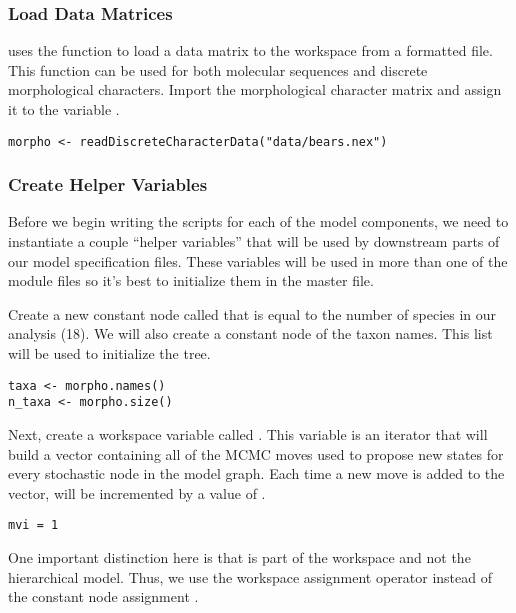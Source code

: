\medskip
\subsubsection{Load Data Matrices}\label{subsub:Exercise-LoadData}

\RevBayes uses the function  to load a data matrix to the workspace from a formatted file. 
This function can be used for both molecular sequences and discrete morphological characters.
Import the morphological character matrix and assign it to the variable . 
{\tt \begin{snugshade*}
\begin{lstlisting}
morpho <- readDiscreteCharacterData("data/bears.nex")
\end{lstlisting}
\end{snugshade*}}

 \medskip
\subsubsection{Create Helper Variables}\label{subsub:Exercise-mviVar}

Before we begin writing the \Rev scripts for each of the model components, we need to instantiate a couple ``helper variables'' that will be used by downstream parts of our model specification files. 
These variables will be used in more than one of the module files so it's best to initialize them in the master file.

Create a new constant node called  that is equal to the number of species in our analysis (18). 
We will also create a constant node of the taxon names.
This list will be used to initialize the tree.

{\tt \begin{snugshade*}
\begin{lstlisting}
taxa <- morpho.names()
n_taxa <- morpho.size() 
\end{lstlisting}
\end{snugshade*}}

Next, create a workspace variable called . 
This variable is an iterator that will build a vector containing all of the MCMC moves used to propose new states for every stochastic node in the model graph. 
Each time a new move is added to the vector,  will be incremented by a value of .
{\tt \begin{snugshade*}
\begin{lstlisting}
mvi = 1
\end{lstlisting}
\end{snugshade*}}
One important distinction here is that  is part of the \RevBayes workspace and not the hierarchical model. 
Thus, we use the workspace assignment operator \cl{=} instead of the constant node assignment \cl{<-}. 

